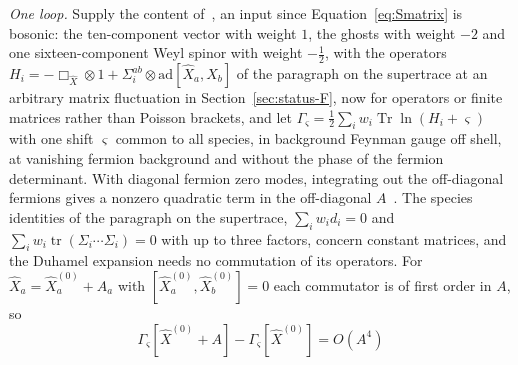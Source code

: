 \emph{One loop.} Supply the content of~\cite{IKKT1997}, an input since Equation~\eqref{eq:Smatrix} is bosonic: the ten-component vector with weight \(1\), the ghosts with weight \(-2\) and one sixteen-component Weyl spinor with weight \(-\tfrac12\), with the operators \(H_i=-\Box_{\hat X}\otimes1+\Sigma_i^{ab}\otimes\mathrm{ad}[\hat X_a,\hat X_b]\) of the paragraph on the supertrace at an arbitrary matrix fluctuation in Section~\ref{sec:status-F}, now for operators or finite matrices rather than Poisson brackets, and let \(\Gamma_\varsigma=\tfrac12\sum_iw_i\operatorname{Tr}\ln(H_i+\varsigma)\) with one shift \(\varsigma\) common to all species, in background Feynman gauge off shell, at vanishing fermion background and without the phase of the fermion determinant. With diagonal fermion zero modes, integrating out the off-diagonal fermions gives a nonzero quadratic term in the off-diagonal \(A\)~\cite{AokiIsoKawaiKitazawaTada1998}. The species identities of the paragraph on the supertrace, \(\sum_iw_id_i=0\) and \(\sum_iw_i\operatorname{tr}(\Sigma_i\cdots\Sigma_i)=0\) with up to three factors, concern constant matrices, and the Duhamel expansion needs no commutation of its operators. For \(\hat X_a=\hat X^{(0)}_a+A_a\) with \([\hat X^{(0)}_a,\hat X^{(0)}_b]=0\) each commutator is of first order in \(A\), so
\[
\Gamma_\varsigma[\hat X^{(0)}+A]-\Gamma_\varsigma[\hat X^{(0)}]=O(A^4)
\]
